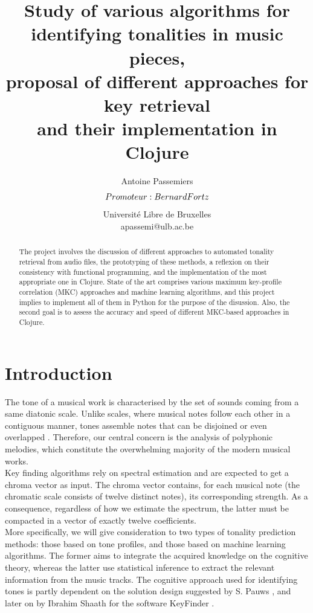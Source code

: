 \documentclass[letterpaper]{article}
\title{Study of various algorithms for identifying tonalities in music pieces, \\ proposal of different approaches for key retrieval \\ and their implementation in Clojure}
\author{Antoine Passemiers$$ \\
Promoteur: Bernard Fortz\\
\mbox{}\\
$$Université Libre de Bruxelles \\
apassemi@ulb.ac.be}
\begin{document}
\maketitle

\renewcommand\bibname{References}        %
\renewcommand{\refname}{References}
\makeatletter
\renewcommand\@biblabel[1]{#1.  }
\makeatother

\setcounter{secnumdepth}{3}

\begin{abstract}
The project involves the discussion of different approaches to automated tonality retrieval from audio files,
the prototyping of these methods, a reflexion on their consistency with functional programming,
and the implementation of the most appropriate one in Clojure.
State of the art comprises various maximum key-profile correlation (MKC) approaches and machine learning algorithms, and this
project implies to implement all of them in Python for the purpose of the disussion. Also, the second goal is to
assess the accuracy and speed of different MKC-based approaches in Clojure.
\end{abstract}

\section{Introduction}

The tone of a musical work is characterised by the set of sounds coming from a same diatonic scale.
Unlike scales, where musical notes follow each other in a contiguous manner, tones assemble notes that can be
disjoined or even overlapped \citep{AD}.
Therefore, our central concern is the analysis of polyphonic melodies, which constitute the overwhelming
majority of the modern musical works.\\

Key finding algorithms rely on spectral estimation and are expected to get a chroma vector as input. The chroma vector contains, for each musical note (the chromatic scale consists of twelve distinct notes), its corresponding strength. As a consequence, regardless of how we estimate the spectrum, the latter must be compacted in a vector of exactly twelve coefficients.\\

More specifically, we will give consideration to two types of tonality prediction methods:
those based on tone profiles, and those based on machine learning algorithms.
The former aims to integrate the acquired knowledge on the cognitive theory, whereas the latter
use statistical inference to extract the relevant information from the music tracks.
The cognitive approach used for identifying tones is partly dependent on the solution design suggested by S. Pauws \citep{SP}, and later on by
Ibrahim Sha\textquotesingle ath for the software KeyFinder \citep{IS}. \\
\end{document}
